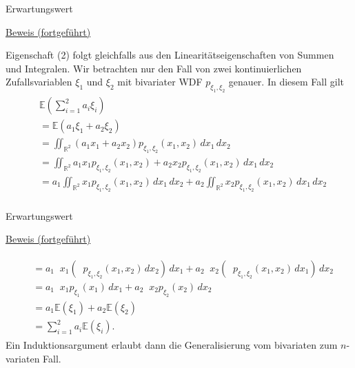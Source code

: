 \documentclass[
  8pt,
  ignorenonframetext,
]{beamer}
\DeclareMathOperator*{\intinf}{\int_{-\infty}^{\infty}}
\begin{document}
\begin{frame}{Erwartungswert}
\protect\hypertarget{erwartungswert-6}{}
\footnotesize

\underline{Beweis (fortgeführt)} \vspace{2mm}

Eigenschaft (2) folgt gleichfalls aus den Linearitätseigenschaften von
Summen und Integralen. Wir betrachten nur den Fall von zwei
kontinuierlichen Zufallsvariablen \(\xi_1\) und \(\xi_2\) mit bivariater
WDF \(p_{\xi_1,\xi_2}\) genauer. In diesem Fall gilt \begin{align}
\begin{split}
& \mathbb{E}\left(\sum_{i=1}^2 a_i\xi_i\right)  \\
& = \mathbb{E}(a_1\xi_1 + a_2\xi_2) \\
& = \iint_{\mathbb{R}^2} (a_1x_1 + a_2x_2)p_{\xi_1,\xi_2}(x_1,x_2)\,dx_1\,dx_2  \\
& = \iint_{\mathbb{R}^2} a_1x_1 p_{\xi_1,\xi_2}(x_1,x_2)
                                   + a_2x_2 p_{\xi_1,\xi_2}(x_1,x_2)\,dx_1\,dx_2            \\
& =  a_1\iint_{\mathbb{R}^2} x_1 p_{\xi_1,\xi_2}(x_1,x_2) \,dx_1\,dx_2
  +  a_2\iint_{\mathbb{R}^2} x_2 p_{\xi_1,\xi_2}(x_1,x_2)\,dx_1\,dx_2           \\
\end{split}
\end{align}
\end{frame}

\begin{frame}{Erwartungswert}
\protect\hypertarget{erwartungswert-7}{}
\footnotesize

\underline{Beweis (fortgeführt)} \vspace{2mm}

\begin{align}
\begin{split} 
& =  a_1\intinf x_1 \left(\intinf p_{\xi_1,\xi_2}(x_1,x_2) \,dx_2 \right)\,dx_1
  +  a_2\intinf x_2 \left(\intinf p_{\xi_1,\xi_2}(x_1,x_2) \,dx_1 \right) \,dx_2 \\
& =  a_1\intinf x_1 p_{\xi_1}(x_1) \,dx_1
  +  a_2\intinf x_2 p_{\xi_2}(x_2) \,dx_2 \\
& =  a_1 \mathbb{E}(\xi_1) +  a_2\mathbb{E}(\xi_2) \\
& = \sum_{i=1}^2 a_i \mathbb{E}(\xi_i).
\end{split}
\end{align} Ein Induktionsargument erlaubt dann die Generalisierung vom
bivariaten zum \(n\)-variaten Fall.
\end{frame}
\end{document}
